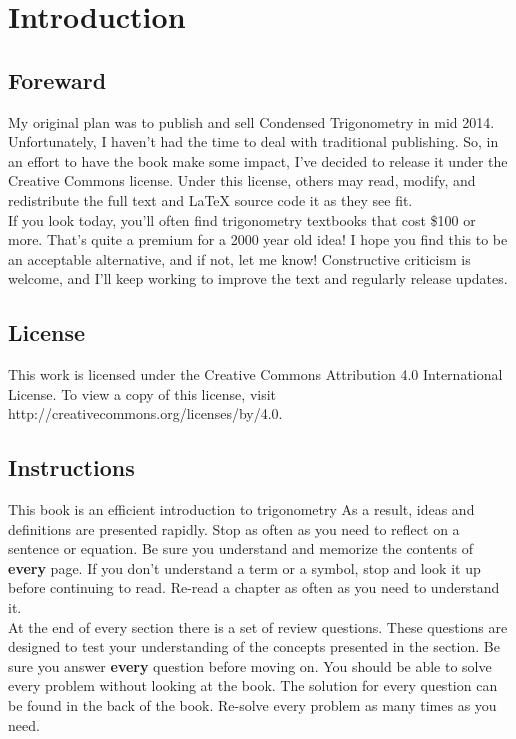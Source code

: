 \section{Introduction}

\subsection{Foreward}

My original plan was to publish and sell Condensed Trigonometry in mid 2014.  Unfortunately, I haven't had the time to deal with traditional publishing.  So, in an effort to have the book make some impact, I've decided to release it under the Creative Commons license.  Under this license, others may read, modify, and redistribute the full text and LaTeX source code it as they see fit.\\

If you look today, you'll often find trigonometry textbooks that cost \$100 or more.  That's quite a premium for a 2000 year old idea!  I hope you find this to be an acceptable alternative, and if not, let me know!  Constructive criticism is welcome, and I'll keep working to improve the text and regularly release updates.\\

\subsection{License}
This work is licensed under the Creative Commons Attribution 4.0 International License. To view a copy of this license, visit \\ http://creativecommons.org/licenses/by/4.0.

\subsection{Instructions}

This book is an efficient introduction to trigonometry   As a result, ideas and definitions are presented rapidly.  Stop as often as you need to reflect on a sentence or equation.  Be sure you understand and memorize the contents of {\bf every} page.  If you don't understand a term or a symbol, stop and look it up before continuing to read.  Re-read a chapter as often as you need to understand it.\\

At the end of every section there is a set of review questions.  These questions are designed to test your understanding of the concepts presented in the section.  Be sure you answer {\bf every} question before moving on.  You should be able to solve every problem without looking at the book.  The solution for every question can be found in the back of the book.  Re-solve every problem as many times as you need.\\

